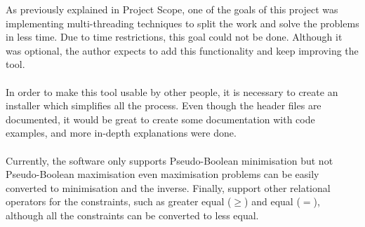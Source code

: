 


As previously explained in Project Scope, one of the goals of this project was implementing multi-threading techniques to split the work and solve the problems in less time. 
Due to time restrictions, this goal could not be done. Although it was optional, the author expects to add this functionality and keep improving the tool. \\\\
In order to make this tool usable by other people, it is necessary to create an installer which simplifies all the process.  Even though the header files are documented, it would be great to create some documentation with code examples, and more in-depth explanations were done. \\\\
Currently, the software only supports Pseudo-Boolean minimisation but not Pseudo-Boolean maximisation even maximisation problems can be easily converted to minimisation and the inverse.  
Finally, support other relational operators for the constraints, such as greater equal ($\geq$) and equal ($=$), although all the constraints can be converted to less equal. 


